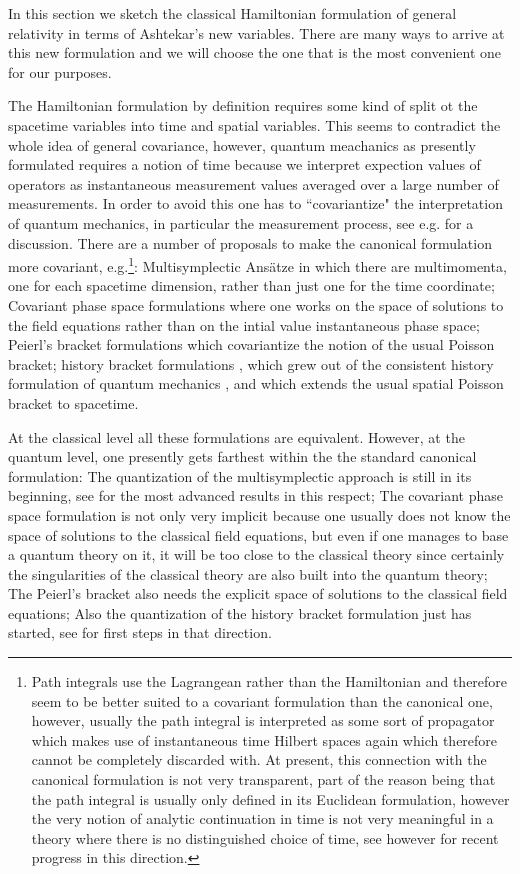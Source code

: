 \documentclass[12pt]{report}
\begin{document}
In this section we sketch the classical Hamiltonian formulation of general
relativity in terms of Ashtekar's new variables. There are many ways 
to arrive at this new formulation and we will choose the one that is the most
convenient one for our purposes.

The Hamiltonian formulation by definition requires some kind of split 
ot the spacetime variables into time and spatial variables. This seems 
to contradict the whole idea of general covariance, however, quantum 
meachanics as presently formulated requires a notion of time because 
we interpret expection values of operators as instantaneous 
measurement values averaged over a large number of measurements. In order 
to avoid this one has to ``covariantize" the interpretation of quantum 
mechanics, in particular the measurement process, see e.g. \cite{8a}
for a discussion. There are a number of proposals to make the canonical
formulation more covariant, e.g.\footnote{Path integrals \cite{8} use 
the Lagrangean rather than the Hamiltonian and therefore seem to be better 
suited to a covariant formulation than the canonical one, however, 
usually the path integral is interpreted as some sort
of propagator which makes use of instantaneous time Hilbert spaces 
again which therefore cannot be completely discarded with. 
At present, this connection with the canonical 
formulation is not very transparent, part of the reason being that
the path integral is usually only defined in its Euclidean formulation, 
however
the very notion of analytic continuation in time is not very meaningful
in a theory where there is no distinguished choice of time, see however
\cite{14} for recent progress in this direction.}:
Multisymplectic Ans\"atze \cite{9}
in which there are multimomenta, one for each spacetime dimension, 
rather
than just one for the time coordinate; Covariant phase space formulations    
\cite{10} 
where one works on the space of solutions to the field equations rather 
than on the intial value instantaneous phase space; Peierl's bracket 
formulations \cite{11} which covariantize the notion of the usual Poisson 
bracket;
history bracket formulations \cite{12}, which grew out of the consistent
history formulation of quantum mechanics \cite{13}, and which 
extends the usual spatial Poisson bracket to spacetime.

At the classical level all these formulations are equivalent. 
However, at the quantum level, one presently gets farthest 
within the the standard canonical formulation:
The quantization of the multisymplectic approach is still in
its beginning, see \cite{15} for the most advanced results in this respect;
The covariant phase space formulation is not only very implicit because 
one usually does not know the space of solutions to the classical field 
equations, but even if one manages to base a quantum theory on it, it
will be too close to the classical theory since certainly the 
singularities of the classical theory are also built into the quantum 
theory; The Peierl's bracket also needs the explicit space of solutions 
to the classical field equations; Also the quantization of the history 
bracket formulation just has started, see \cite{16} for first steps in that
direction.
\end{document}
